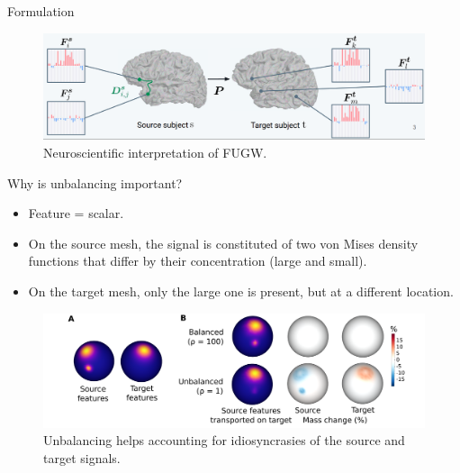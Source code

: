 \documentclass{beamer}
\begin{document}
\begin{frame}{Formulation}
\vspace{-0.6cm}
\begin{figure}
  \centering
  \includegraphics[width=1.\linewidth, keepaspectratio=true]{OT_new/fugw.png}
  \caption*{\scriptsize{Neuroscientific interpretation of FUGW.}}
\end{figure}
\end{frame}

\begin{frame}{Why is unbalancing important?}
\scriptsize
\begin{itemize}
  \item Feature = scalar.
  \item On the source mesh, the signal is constituted of two von Mises density functions that differ
  by their concentration (large and small).
  \item On the target mesh, only the large one is present, but at a different location.
\end{itemize}
  \begin{figure}
    \centering
    \includegraphics[width=1.\linewidth, keepaspectratio=true]{OT_new/toy_example.pdf}
    \caption*{\scriptsize{Unbalancing helps accounting for idiosyncrasies of the source and target signals.}}
  \end{figure}
\end{frame}
\end{document}
